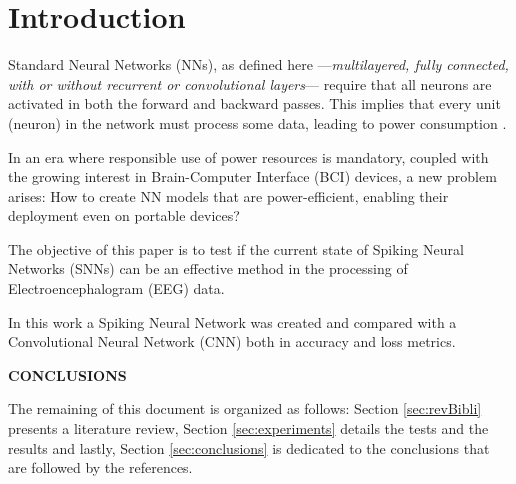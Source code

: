 \section{Introduction}
\label{introduction}
	\par Standard Neural Networks (NNs), as defined here —\textit{multilayered, fully connected, with or without recurrent or convolutional layers}— require that all neurons are activated in both the forward and backward passes. This implies that every unit (neuron) in the network must process some data, leading to power consumption \cite{10242251}.
	
	\par In an era where responsible use of power resources is mandatory, coupled with the growing interest in Brain-Computer Interface (BCI) devices, a new problem arises: How to create NN models that are power-efficient, enabling their deployment even on portable devices?

	\par The objective of this paper is to test if the current state of Spiking Neural Networks (SNNs) can be an effective method in the processing of Electroencephalogram (EEG) data.
	
	\par In this work a Spiking Neural Network was created and compared with a Convolutional Neural Network (CNN) both in accuracy and loss metrics. 

	\par \textbf{CONCLUSIONS}
	
	\par The remaining of this document is organized as follows: Section \ref{sec:revBibli} presents a literature review, Section \ref{sec:experiments} details the tests and the results and lastly, Section \ref{sec:conclusions} is dedicated to the conclusions that are followed by the references. 